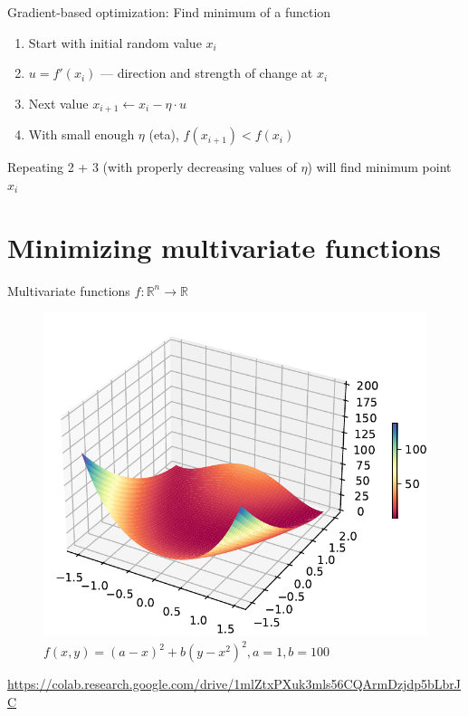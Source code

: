 \documentclass[12pt,aspectratio=169,handout]{beamer}
\begin{document}
\begin{frame}{Gradient-based optimization: Find minimum of a function}
	
\begin{figure}
\end{figure}
	
	
	\begin{enumerate}
		\item Start with initial random value $x_i$
		\item $u = f'(x_i)$ --- direction and strength of change at $x_i$
		\item Next value $x_{i + 1} \gets x_i - \eta \cdot u$
		\item With small enough $\eta$ (eta), $f(x_{i+1}) < f(x_i)$
	\end{enumerate}
	Repeating 2 + 3 (with properly decreasing values of $\eta$) will find minimum point $x_i$
	
	
	
\end{frame}



\section{Minimizing multivariate functions}

\begin{frame}{Multivariate functions $f: \mathbb{R}^n \to \mathbb{R}$}

	\begin{figure}
		\centering
		\includegraphics[trim={0 0.1cm 0 0.8cm},clip,width=0.55\linewidth]{img/rosenbrock.pdf}
		\caption{$f(x,y)=(a-x)^{2}+b(y-x^{2})^{2}, a = 1, b = 100$}
	\end{figure}
{\tiny \url{https://colab.research.google.com/drive/1mlZtxPXuk3mls56CQArmDzjdp5bLbrJC}}

\end{frame}
\end{document}
